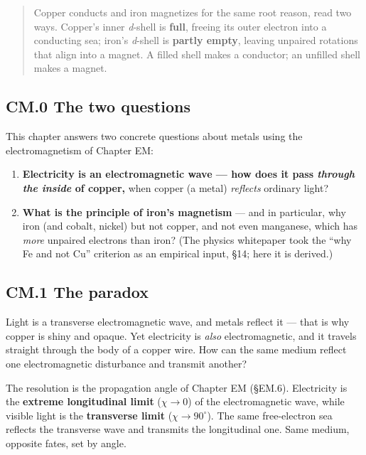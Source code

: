 \documentclass[
  10pt,
]{article}
\providecommand{\tightlist}{%
  \setlength{\itemsep}{0pt}\setlength{\parskip}{0pt}}
\begin{document}
\begin{quote}
Copper conducts and iron magnetizes for the same root reason, read two
ways. Copper's inner \emph{d}-shell is \textbf{full}, freeing its outer
electron into a conducting sea; iron's \emph{d}-shell is \textbf{partly
empty}, leaving unpaired rotations that align into a magnet. A filled
shell makes a conductor; an unfilled shell makes a magnet.
\end{quote}

\hypertarget{cm.0-the-two-questions}{%
\subsection{CM.0 The two questions}\label{cm.0-the-two-questions}}

This chapter answers two concrete questions about metals using the
electromagnetism of Chapter EM:

\begin{enumerate}
\def\labelenumi{\arabic{enumi}.}
\tightlist
\item
  \textbf{Electricity is an electromagnetic wave --- how does it pass
  \emph{through the inside} of copper,} when copper (a metal)
  \emph{reflects} ordinary light?
\item
  \textbf{What is the principle of iron's magnetism} --- and in
  particular, why iron (and cobalt, nickel) but not copper, and not even
  manganese, which has \emph{more} unpaired electrons than iron? (The
  physics whitepaper took the ``why Fe and not Cu'' criterion as an
  empirical input, §14; here it is derived.)
\end{enumerate}

\hypertarget{cm.1-the-paradox}{%
\subsection{CM.1 The paradox}\label{cm.1-the-paradox}}

Light is a transverse electromagnetic wave, and metals reflect it ---
that is why copper is shiny and opaque. Yet electricity is \emph{also}
electromagnetic, and it travels straight through the body of a copper
wire. How can the same medium reflect one electromagnetic disturbance
and transmit another?

The resolution is the propagation angle of Chapter EM (§EM.6).
Electricity is the \textbf{extreme longitudinal limit} (\(\chi \to 0\))
of the electromagnetic wave, while visible light is the
\textbf{transverse limit} (\(\chi \to 90^\circ\)). The same
free-electron sea reflects the transverse wave and transmits the
longitudinal one. Same medium, opposite fates, set by angle.
\end{document}
